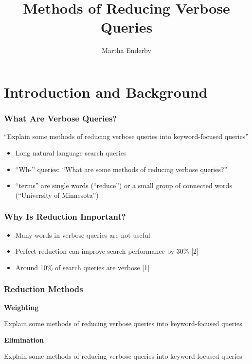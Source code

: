 \documentclass{beamer}
\begin{document}
\title{Methods of Reducing Verbose Queries}  
\author{Martha Enderby}


\begin{frame}
\titlepage
\end{frame}

\section{Introduction and Background}
\begin{frame}[fragile]\frametitle{What Are Verbose Queries?}
``Explain some methods of reducing verbose queries into
keyword-focused queries''
\begin{itemize} 
\item Long natural language search queries
\item ``Wh-'' queries: ``What are some methods of reducing verbose queries?''
\item ``terms'' are single words (``reduce'') or a small group of connected words (``University of Minnesota'')
\end{itemize}
\end{frame}

\begin{frame}[fragile]\frametitle{Why Is Reduction Important?}
\begin{itemize}
\item{Many words in verbose queries are not useful} \pause
\item{Perfect reduction can improve search \linebreak performance by 30\% [2]} \pause
\item{Around 10\% of search queries are verbose [1]}
\end{itemize}
\end{frame}

\begin{frame}[fragile]\frametitle{Reduction Methods}
\textbf{Weighting} \pause

\scriptsize{Explain} \tiny{some} \normalsize{methods} \tiny{of}
\large {reducing} \Large{verbose queries} \tiny{into}
\small{keyword-focused queries} \vspace*{1cm} \pause

\textbf{Elimination} \pause

\sout{Explain some} methods \sout{of} reducing verbose queries
\sout{into keyword-focused queries}
\end{frame}
\end{document}
